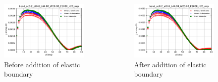 \begin{frame}
\begin{columns}
\begin{column}{0.45\columnwidth}
\begin{figure}[tbp]
\centering
\includegraphics[width=\columnwidth]{negative_J}
\caption{Before addition of elastic boundary}
\end{figure}
\end{column}
\begin{column}{0.45\columnwidth}
\begin{figure}
\centering
\includegraphics[width=\columnwidth]{negative_J_corrected}
\caption{After addition of elastic boundary}
\end{figure}
\end{column}
\end{columns}
\end{frame}

